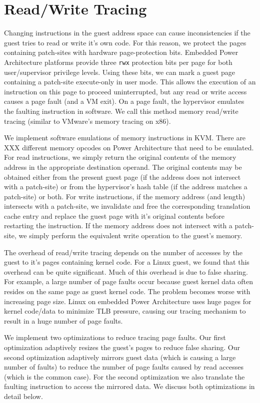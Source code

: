 \documentclass[10pt,twocolumn]{article}
\begin{document}
\section{Read/Write Tracing}
\label{sec:tracing}
Changing instructions in the guest address space can cause
inconsistencies if the guest tries to read or write it's own code.
For this reason, we protect the pages containing patch-sites with hardware
page-protection bits. Embedded Power Architecture platforms provide three {\tt rwx}
protection bits per page for both user/supervisor privilege levels. Using these
bits, we can mark a guest page containing a patch-site
execute-only in user mode. This allows the
execution of an instruction on this page to proceed uninterrupted,
but any read or write access causes a page fault (and a VM exit).
On a page fault, the hypervisor
emulates the faulting instruction in software. We call this
method memory read/write tracing (similar to VMware's memory tracing
on x86\cite{agesen:comparison}).

We implement software emulations of memory instructions in KVM. There are XXX
different memory opcodes on Power Architecture that need to be emulated.
For read instructions, we simply return the original contents of the memory
address in the appropriate destination
operand. The original contents may be obtained either from the present guest
page (if the address does not intersect with a patch-site) or from the hypervisor's
hash table (if the address matches a patch-site) or both.
For write instructions, if the memory address (and length) intersects with a patch-site,
we invalidate and free the corresponding translation cache
entry and replace the guest page with it's original contents before
restarting the instruction. If the memory address does not intersect with a
patch-site, we simply perform the equivalent write operation to the guest's memory.

The overhead of read/write tracing depends on the number of accesses by the guest
to it's pages containing kernel code. For a Linux guest, we found that this overhead
can be quite significant.
Much of this overhead is due to false sharing. For example, a large number of page
faults occur because guest kernel data often resides on the same page as
guest kernel code. The problem becomes worse with increasing page size. Linux
on embedded
Power Architecture uses huge pages for kernel code/data to minimize
TLB pressure, causing our tracing mechanism to result in a huge number of page
faults.

We implement two optimizations to reduce tracing page faults. Our first optimization
adaptively resizes the guest's pages to reduce false sharing.
Our second optimization adaptively
mirrors guest data (which is causing a large number of faults) to reduce the number
of page faults caused by read accesses (which is the common case). For the second
optimization we also translate the faulting instruction to access the mirrored data.
We discuss both optimizations in detail below.
\end{document}
